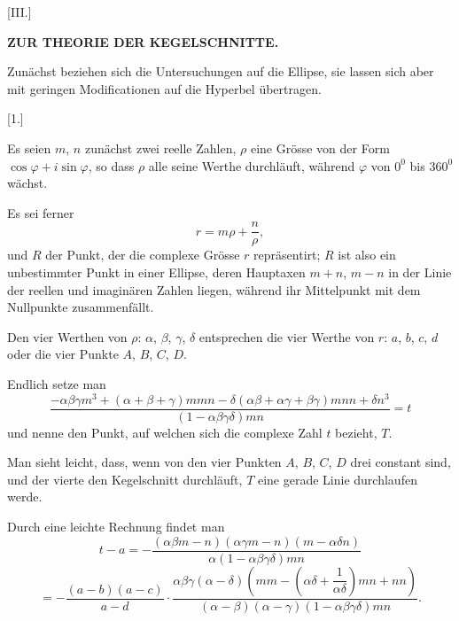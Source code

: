 
\begin{center}
[III.]

\textbf{ZUR THEORIE DER KEGELSCHNITTE.}
\end{center}

Zunächst beziehen sich die Untersuchungen auf die Ellipse, sie lassen sich
aber mit geringen Modificationen auf die Hyperbel übertragen.

\begin{center}
[1.]
\end{center}

Es seien $m$, $n$ zunächst zwei reelle Zahlen, $\rho$ eine Grösse von der
Form $\cos\varphi + i\sin\varphi$, so dass $\rho$ alle seine Werthe
durchläuft, während $\varphi$ von $0^0$ bis $360^0$ wächst.

Es sei ferner
\[
r = m\rho + \dfrac{n}{\rho},
\]
und $R$ der Punkt, der die complexe Grösse $r$ repräsentirt; $R$ ist also
ein unbestimmter Punkt in einer Ellipse, deren Hauptaxen $m+n$, $m-n$ in
der Linie der reellen und imaginären Zahlen liegen, während ihr
Mittelpunkt mit dem Nullpunkte zusammenfällt.

Den vier Werthen von $\rho$: $\alpha$, $\beta$, $\gamma$, $\delta$
entsprechen die vier Werthe von $r$: $a$, $b$, $c$, $d$ oder die vier
Punkte $A$, $B$, $C$, $D$.

Endlich setze man
\[
\dfrac{-\alpha\beta\gamma m^3 + (\alpha+\beta+\gamma) m m n
  - \delta(\alpha\beta+\alpha\gamma+\beta\gamma) m n n + \delta n^3}
  {(1-\alpha\beta\gamma\delta) m n} = t
\]
und nenne den Punkt, auf welchen sich die complexe Zahl $t$ bezieht, $T$.

Man sieht leicht, dass, wenn von den vier Punkten $A$, $B$, $C$, $D$ drei
constant sind, und der vierte den Kegelschnitt durchläuft, $T$ eine gerade
Linie durchlaufen werde.

Durch eine leichte Rechnung findet man
\[
t - a = -\dfrac{(\alpha\beta m - n)(\alpha\gamma m - n)(m - \alpha\delta n)}
  {\alpha(1-\alpha\beta\gamma\delta) m n}
\]
\[
= -\dfrac{(a-b)(a-c)}{a-d} \cdot
  \dfrac{\alpha\beta\gamma(\alpha-\delta)\left(mm -
  \left(\alpha\delta+\dfrac{1}{\alpha\delta}\right) m n + n n\right)}
  {(\alpha-\beta)(\alpha-\gamma)(1-\alpha\beta\gamma\delta) m n}.
\]
